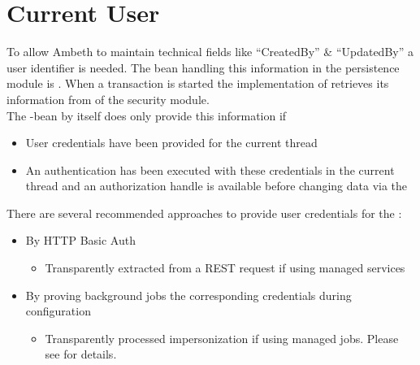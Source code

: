 \section{Current User}
\label{feature:CurrentUser}
To allow Ambeth to maintain technical fields like ``CreatedBy'' \& ``UpdatedBy'' a user identifier is needed. The bean handling this information in the persistence module is . When a transaction is started the implementation of  retrieves its information from  of the security module.\\

The \type{ISecurityContextHolder]}-bean by itself does only provide this information if
\begin{itemize}
	\item User credentials have been provided for the current thread
	\item An authentication has been executed with these credentials in the current thread and an authorization handle is available before changing data via the 
\end{itemize}

There are several recommended approaches to provide user credentials for the :
\begin{itemize}
	\item By HTTP Basic Auth
		\begin{itemize}
			\item Transparently extracted from a REST request if using \AMBETH{} managed services
		\end{itemize}
	\item By proving background jobs the corresponding credentials during configuration
		\begin{itemize}
			\item Transparently processed impersonization if using \AMBETH{} managed jobs. Please see  for details.
		\end{itemize}
\end{itemize}

